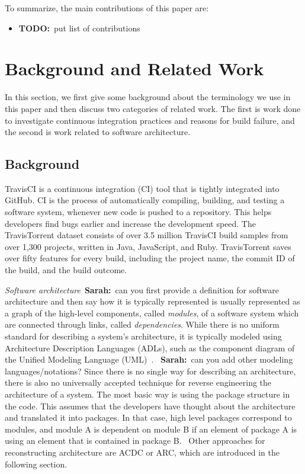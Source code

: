 \documentclass[sigplan, anonymous, review]{acmart}
\newcommand{\sn}[1]{{\color{blue}\textbf{Sarah:}~#1}}
\newcommand{\todo}[1]{{ \color{red} \textbf{TODO:}~#1}}
\begin{document}
To summarize, the main contributions of this paper are:
\begin{itemize}
\item \todo{put list of contributions}
\end{itemize}


\section{Background and Related Work}

In this section, we first give some background about the terminology we use in this paper and then discuss two categories of related work. The first is work done to investigate continuous integration practices and reasons for build failure, and the second is work related to software architecture.

\subsection{Background}
TravisCI is a continuous integration (CI) tool that is tightly integrated into GitHub. CI is the process of automatically compiling, building, and testing a software system, whenever new code is pushed to a repository. This helps developers find bugs earlier and increase the development speed. 
The TravisTorrent dataset \cite{TravisTorrent} consists of over 3.5 million TravisCI build samples from over 1,300 projects, written in Java, JavaScript, and Ruby.
TravisTorrent saves over fifty features for every build, including the project name, the commit ID of the build, and the build outcome.

\textit{Software architecture}~\sn{can you first provide a definition for software architecture and then say how it is typically represented} is usually represented as a graph of the high-level components, called \textit{modules}, of a software system which are connected through links, called \textit{dependencies}. While there is no uniform standard for describing a system's architecture, it is typically modeled using Architecture Description Languages (ADLs), such as the component diagram of the Unified Modeling Language (UML)~\cite{UML-Arch}. ~\sn{can you add other modeling languages/notations?}
Since there is no single way for describing an architecture, there is also no universally accepted technique for reverse engineering the architecture of a system. The most basic way is using the package structure in the code. This assumes that the developers have thought about the architecture and translated it into packages. In that case, high level packages correspond to modules, and module A is dependent on module B if an element of package A is using an element that is contained in package B.~\cite{todo}
Other approaches for reconstructing architecture are ACDC or ARC, which are introduced in the following section.
\end{document}
